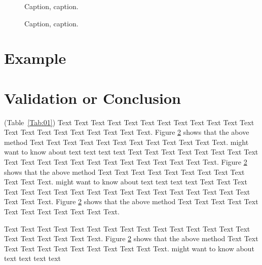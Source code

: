 \documentclass{bioinfo}
\begin{document}
\begin{figure}[!tpb]%
\caption{Caption, caption.}\label{fig:01}
\end{figure}

\begin{figure}[!tpb]%
\caption{Caption, caption.}\label{fig:02}
\end{figure}

\section{Example}









%
%






\section{Validation or Conclusion}

(Table~\ref{Tab:01}) Text Text Text Text Text Text  Text Text Text Text Text Text Text Text Text  Text Text Text Text Text Text. Figure \ref{fig:02} shows that the above method  Text Text Text Text  Text Text Text Text Text Text  Text Text.  \citealp{Boffelli03} might want to know about  text text text text
Text Text Text Text Text Text  Text Text Text Text Text Text Text Text Text  Text Text Text Text Text Text. Figure \ref{fig:02} shows that the above method  Text Text Text Text  Text Text Text Text Text Text  Text Text.  \citealp{Boffelli03} might want to know about  text text text text
Text Text Text Text Text Text  Text Text Text Text Text Text Text Text Text  Text Text Text Text Text Text. Figure \ref{fig:02} shows that the above method  Text Text Text Text  Text Text Text Text Text Text  Text Text.



Text Text Text Text Text Text  Text Text Text Text Text Text Text Text Text  Text Text Text Text Text Text. Figure \ref{fig:02} shows that the above method  Text Text Text Text  Text Text Text Text Text Text  Text Text.  \citealp{Boffelli03} might want to know about  text text text text
\end{document}
